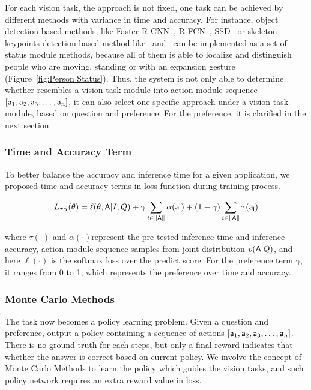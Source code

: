 For each vision task, the approach is not fixed, one task can be achieved by different methods with variance in time and accuracy. For instance, object detection based methods, like Faster R-CNN~\cite{Ren:2015:FRT:2969239.2969250}, R-FCN~\cite{DBLP:conf/nips/DaiLHS16}, SSD~\cite{DBLP:conf/eccv/LiuAESRFB16} or skeleton keypoints detection based method like~\cite{cao2017realtime} and~\cite{wei2016cpm} can be implemented as a set of status module methods, because all of them is able to localize and distinguish people who are moving, standing or with an expansion gesture (Figure~\ref{fig:Person Status}). Thus, the system is not only able to determine whether resembles a vision task module into action module sequence $[{\mathsf{a}}_1,{\mathsf{a}}_2,{\mathsf{a}}_3,\dots,{\mathsf{a}}_n]$, it can also select one specific approach under a vision task module, based on question and preference. For the preference, it is clarified in the next section.


\subsubsection{Time and Accuracy Term}
\label{sec-TimeAcc}
\hspace{\parindent} To better balance the accuracy and inference time for a given application, we proposed time and accuracy terms in loss function during training process.

\begin{small}
\begin{equation} 
    L_{\tau\alpha}(\theta) = \ell(\theta,{\mathsf{A}}|I, Q) + \gamma\sum_{i\in\|{\mathsf{A}}\|}\alpha({\mathsf{a_i}}) + (1-\gamma)\sum_{i\in\|{\mathsf{A}}\|}\tau({\mathsf{a_i}})
\end{equation}
\end{small}

\noindent where $\tau(\cdot)$ and $\alpha(\cdot)$represent the pre-tested inference time and inference accuracy, action module sequence  samples from joint distribution $p({\mathsf{A}}|Q)$, and here $\ell(\cdot)$ is the softmax loss over the predict score. For the preference term $\gamma$, it ranges from 0 to 1, which represents the preference over time and accuracy.

\subsubsection{Monte Carlo Methods}
\label{sec-MC}
\hspace{\parindent} The task now becomes a policy learning problem. Given a question and preference, output a policy containing a sequence of actions $[{\mathsf{a}}_1,{\mathsf{a}}_2,{\mathsf{a}}_3,\dots,{\mathsf{a}}_n]$. There is no ground truth for each steps, but only a final reward indicates that whether the answer is correct based on current policy. We involve the concept of Monte Carlo Methods to learn the policy which guides the vision tasks, and such policy network requires an extra reward value in loss.

